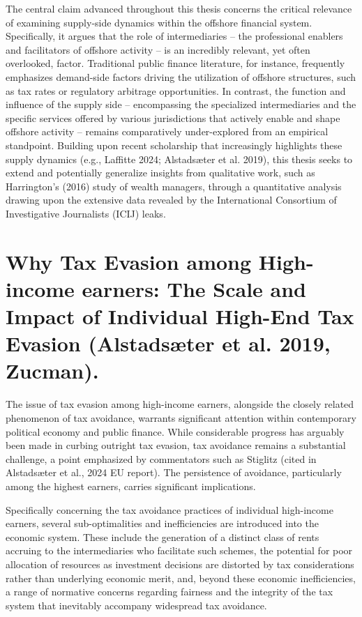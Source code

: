 The central claim advanced throughout this thesis concerns the critical relevance of examining supply-side dynamics within the offshore financial system. Specifically, it argues that the role of intermediaries – the professional enablers and facilitators of offshore activity – is an incredibly relevant, yet often overlooked, factor. Traditional public finance literature, for instance, frequently emphasizes demand-side factors driving the utilization of offshore structures, such as tax rates or regulatory arbitrage opportunities. In contrast, the function and influence of the supply side – encompassing the specialized intermediaries and the specific services offered by various jurisdictions that actively enable and shape offshore activity – remains comparatively under-explored from an empirical standpoint. Building upon recent scholarship that increasingly highlights these supply dynamics (e.g., Laffitte 2024; Alstadsæter et al. 2019), this thesis seeks to extend and potentially generalize insights from qualitative work, such as Harrington's (2016) study of wealth managers, through a quantitative analysis drawing upon the extensive data revealed by the International Consortium of Investigative Journalists (ICIJ) leaks.

\section{Why Tax Evasion among High-income earners: The Scale and Impact of Individual High-End Tax Evasion (Alstadsæter et al. 2019, Zucman).}

The issue of tax evasion among high-income earners, alongside the closely related phenomenon of tax avoidance, warrants significant attention within contemporary political economy and public finance. While considerable progress has arguably been made in curbing outright tax evasion, tax avoidance remains a substantial challenge, a point emphasized by commentators such as Stiglitz (cited in Alstadsæter et al., 2024 EU report). The persistence of avoidance, particularly among the highest earners, carries significant implications.

Specifically concerning the tax avoidance practices of individual high-income earners, several sub-optimalities and inefficiencies are introduced into the economic system. These include the generation of a distinct class of rents accruing to the intermediaries who facilitate such schemes, the potential for poor allocation of resources as investment decisions are distorted by tax considerations rather than underlying economic merit, and, beyond these economic inefficiencies, a range of normative concerns regarding fairness and the integrity of the tax system that inevitably accompany widespread tax avoidance.

